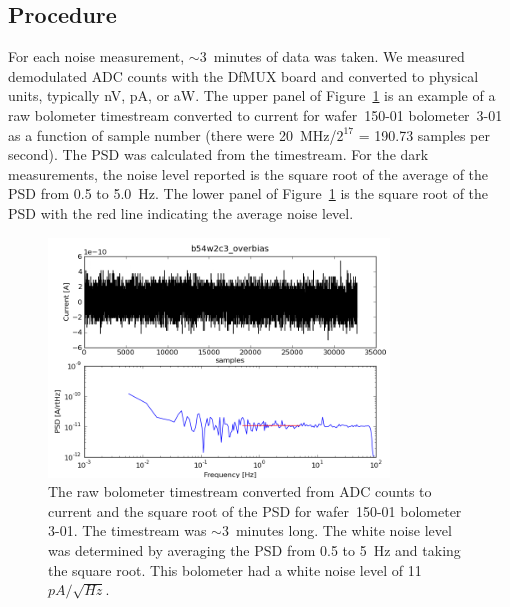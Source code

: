 \subsection{Procedure}
\label{sec:procedure}

For each noise measurement, $\sim$3~minutes of data was taken. 
We measured demodulated \ac{ADC} counts with the \ac{DfMUX} board and converted to physical units, typically nV, pA, or aW. 
The upper panel of Figure~\ref{fig:timestream_and_psd} is an example of a raw bolometer timestream converted to current for wafer~150-01 bolometer~3-01 as a function of sample number (there were 20~MHz/$2^{17}$ = 190.73 samples per second).
The \ac{PSD} was calculated from the timestream. 
For the dark measurements, the noise level reported is the square root of the average of the \ac{PSD} from 0.5 to 5.0~Hz. 
The lower panel of Figure~\ref{fig:timestream_and_psd} is the square root of the PSD with the red line indicating the average noise level. 

\begin{figure}[ht!]
\begin{center}
\includegraphics[height=2.5in]{figures/b54w2c3_overbias.png}
\caption{The raw bolometer timestream converted from \ac{ADC} counts to current and the square root of the PSD for wafer~150-01 bolometer 3-01. The timestream was $\sim$3~minutes long. The white noise level was determined by averaging the \ac{PSD} from 0.5 to 5~Hz and taking the square root. This bolometer had a white noise level of 11~$pA/\sqrt{Hz}$. 
\label{fig:timestream_and_psd} }
\end{center}
\end{figure}



